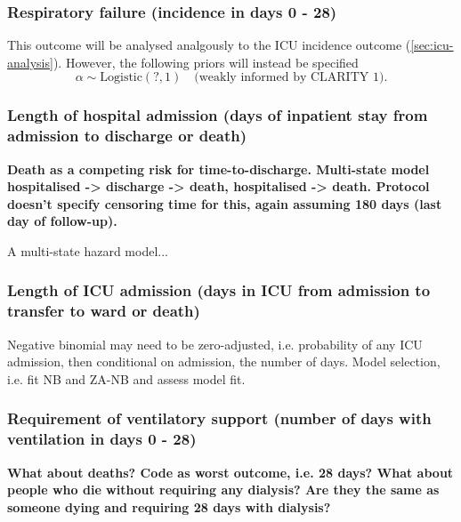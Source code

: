 \documentclass[11pt,parskip=half-]{scrartcl}
\begin{document}
\subsubsection{Respiratory failure (incidence in days 0 - 28)}
This outcome will be analysed analgously to the ICU incidence outcome (\ref{sec:icu-analysis}). However, the following priors will instead be specified
$$
    \alpha \sim \text{Logistic}(?, 1) \quad \text{(weakly informed by CLARITY 1)}.
$$

\subsubsection{Length of hospital admission (days of inpatient stay from admission to discharge or death)}

\textbf{Death as a competing risk for time-to-discharge. Multi-state model hospitalised -> discharge -> death, hospitalised -> death. Protocol doesn't specify censoring time for this, again assuming 180 days (last day of follow-up).}

A multi-state hazard model...

\subsubsection{Length of ICU admission (days in ICU from admission to transfer to ward or death)}
Negative binomial may need to be zero-adjusted, i.e. probability of any ICU admission, then conditional on admission, the number of days. Model selection, i.e. fit NB and ZA-NB and assess model fit.

\subsubsection{Requirement of ventilatory support (number of days with ventilation in days 0 - 28)}\label{sec:vent-support}

\textbf{What about deaths? Code as worst outcome, i.e. 28 days? What about people who die without requiring any dialysis? Are they the same as someone dying and requiring 28 days with dialysis?}
\end{document}
